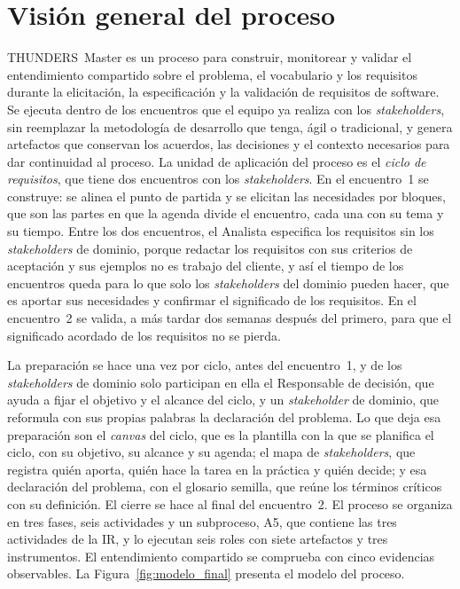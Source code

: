 \documentclass[12pt,letterpaper,oneside]{report}
\begin{document}
\section{Visión general del proceso}
\label{sec:vista}
THUNDERS~Master es un proceso para construir, monitorear y validar el
entendimiento compartido sobre el problema, el vocabulario y los requisitos
durante la elicitación, la especificación y la validación de requisitos de
software. Se ejecuta dentro de los encuentros que el equipo ya realiza con los
\textit{stakeholders}, sin reemplazar la metodología de desarrollo que tenga,
ágil o tradicional, y genera artefactos que conservan los acuerdos, las decisiones 
y el contexto necesarios para dar continuidad al proceso.
La unidad de aplicación del proceso es el \emph{ciclo de requisitos}, que tiene
dos encuentros con los \textit{stakeholders}. En el encuentro~1 se construye: se
alinea el punto de partida y se elicitan las necesidades por bloques, que son
las partes en que la agenda divide el encuentro, cada una con su tema y su
tiempo. Entre los dos encuentros, el Analista especifica los requisitos sin los
\textit{stakeholders} de dominio, porque redactar los requisitos con sus
criterios de aceptación y sus ejemplos no es trabajo del cliente, y así el
tiempo de los encuentros queda para lo que solo los \textit{stakeholders} del
dominio pueden hacer, que es aportar sus necesidades y confirmar el significado
de los requisitos. En el encuentro~2 se valida, a más tardar dos semanas después
del primero, para que el significado acordado de los requisitos no se pierda.

La preparación se hace una vez por ciclo, antes del encuentro~1, y de los
\textit{stakeholders} de dominio solo participan en ella el Responsable de
decisión, que ayuda a fijar el objetivo y el alcance del ciclo, y un
\textit{stakeholder} de dominio, que reformula con sus propias palabras la
declaración del problema. Lo que deja esa preparación son el \textit{canvas}
del ciclo, que es la plantilla con la que se planifica el ciclo, con su
objetivo, su alcance y su agenda; el mapa de \textit{stakeholders}, que registra
quién aporta, quién hace la tarea en la práctica y quién decide; y esa
declaración del problema, con el glosario semilla, que reúne los términos
críticos con su definición. El cierre se hace al
final del encuentro~2. El proceso se
organiza en tres fases, seis actividades y un subproceso, A5, que contiene las
tres actividades de la IR, y lo ejecutan seis roles con siete artefactos y tres
instrumentos. El entendimiento compartido se comprueba con cinco evidencias
observables. La Figura~\ref{fig:modelo_final} presenta el modelo del proceso.
\end{document}
